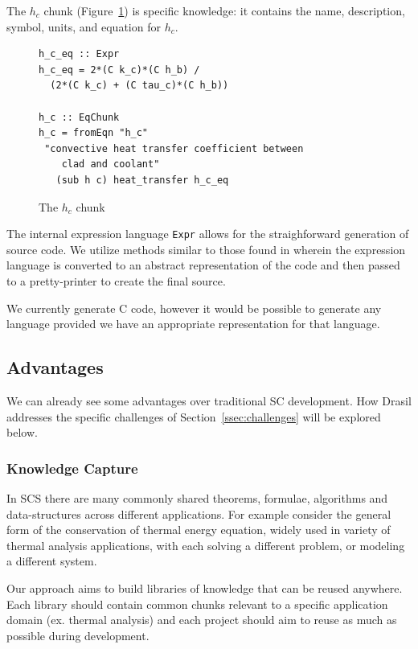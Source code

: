 \documentclass{sig-alternate-05-2015}
\newcommand{\lss}{Drasil}
\begin{document}
The $h_c$ chunk (Figure~\ref{fig:know_specific}) is specific
knowledge: it contains the name, description, symbol, units, and equation
for $h_c$.

\begin{figure}
\begin{lstlisting}[frame=single, showstringspaces=false, basicstyle=\small]
h_c_eq :: Expr
h_c_eq = 2*(C k_c)*(C h_b) /
  (2*(C k_c) + (C tau_c)*(C h_b))

h_c :: EqChunk
h_c = fromEqn "h_c" 
 "convective heat transfer coefficient between 
    clad and coolant"
   (sub h c) heat_transfer h_c_eq
\end{lstlisting}
\caption{The $h_c$ chunk}
\label{fig:know_specific}
\end{figure}

The internal expression language \lstinline|Expr|
allows for the straighforward generation of source code. We utilize methods
similar to those found in \cite{SAGA:DSL, Szymczak2014}
wherein the expression language is converted to an abstract representation of
the code and then passed to a pretty-printer to create the final source.

We currently generate C code, however it would be possible to generate any
language provided we have an appropriate representation for that language.

\subsection{Advantages} \label{ssec:advantages}

We can already see some advantages over traditional SC
development. How \lss{} addresses the specific challenges of
Section~\ref{ssec:challenges} will be explored below.

\subsubsection{Knowledge Capture} \label{sssec:adv_knowledge}

In SCS there are many commonly shared theorems, formulae, algorithms and
data-structures across different applications. For example consider the general
form of the conservation of thermal energy equation, widely used in variety of
thermal analysis applications, with each solving a different problem, or
modeling a different system.

Our approach aims to build libraries of knowledge that can be reused anywhere.
Each library should contain common chunks relevant to a specific application
domain (ex. thermal analysis) and each project should aim to reuse as much as
possible during development.
\end{document}
